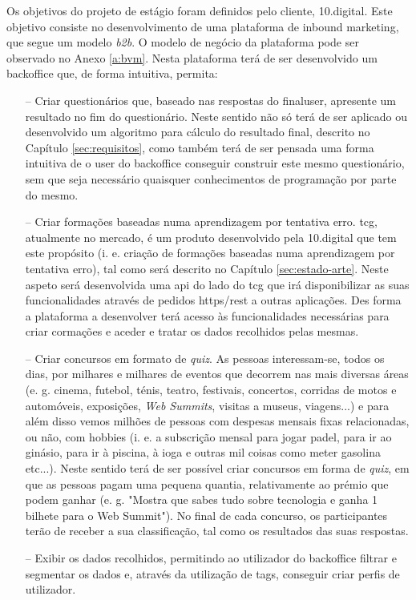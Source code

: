Os objetivos do projeto de estágio foram definidos pelo cliente, 10.digital. Este objetivo consiste no desenvolvimento de uma plataforma de inbound marketing, que segue um modelo \textit{\gls{b2b}}. O modelo de negócio da plataforma pode ser observado no Anexo \ref{a:bvm}. Nesta plataforma terá de ser desenvolvido um \gls{backoffice} que, de forma intuitiva, permita:
\begin{itemize}
	\item[--] Criar questionários que, baseado nas respostas do \gls{finaluser}, apresente um resultado no fim do questionário. Neste sentido não só terá de ser aplicado ou desenvolvido um algoritmo para cálculo do resultado final, descrito no Capítulo \ref{sec:requisitos}, como também terá de ser pensada uma forma intuitiva de o \gls{user} do \gls{backoffice} conseguir construir este mesmo questionário, sem que seja necessário quaisquer conhecimentos de programação por parte do mesmo.
	\item[--] Criar formações baseadas numa aprendizagem por tentativa erro. \acrfull{tcg}\cite{tcg}, atualmente no mercado, é um produto desenvolvido pela 10.digital que tem este propósito (i. e. criação de formações baseadas numa aprendizagem por tentativa erro), tal como será descrito no Capítulo \ref{sec:estado-arte}. Neste aspeto será desenvolvida uma \acrshort{api} do lado do \acrshort{tcg} que irá disponibilizar as suas funcionalidades através de pedidos \acrshort{https}/\acrshort{rest} a outras aplicações. Des forma a plataforma a desenvolver terá acesso às funcionalidades necessárias para criar cormações e aceder e tratar os dados recolhidos pelas mesmas.	
	\item[--] Criar concursos em formato de \textit{quiz}. As pessoas interessam-se, todos os dias, por milhares e milhares de eventos que decorrem nas mais diversas áreas (e. g. 	cinema, futebol, ténis, teatro, festivais, concertos, corridas de motos e automóveis, exposições, \textit{Web Summits}\cite{websummit}, visitas a museus, viagens...) e para além disso
	vemos milhões de pessoas com despesas mensais fixas relacionadas, ou não, com hobbies (i. e. a subscrição mensal para jogar padel, para ir ao ginásio, para ir à piscina, à ioga e outras mil coisas como meter gasolina etc...). Neste sentido terá de ser possível criar concursos em forma de \textit{quiz}, em que as pessoas pagam uma pequena quantia, relativamente ao prémio que podem ganhar (e. g. "Mostra que sabes tudo sobre tecnologia e ganha 1 bilhete para o Web Summit"). No final de cada concurso, os participantes terão de receber a sua classificação, tal como os resultados das suas respostas.
	\item[--] Exibir os dados recolhidos, permitindo ao utilizador do \gls{backoffice} filtrar e segmentar os dados e, através da utilização de \gls{tags}, conseguir criar perfis de utilizador.
\end{itemize}



